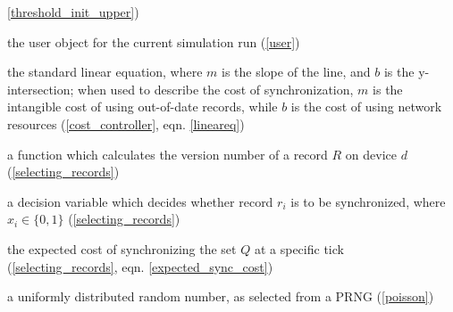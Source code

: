 \begin{description}
\ref{threshold_init_upper})
\item[$U$] the user object for the current simulation run (\ref{user})
\item[$y=mx+b$] the standard linear equation, where $m$ is the slope of the line, and $b$ is the y-intersection; when used to describe the cost of synchronization, $m$ is the intangible cost of using out-of-date records, while $b$ is the cost of using network resources (\ref{cost_controller}, eqn. \ref{lineareq})
\item[$V(R, d)$] a function which calculates the version number of a record $R$ on device $d$ (\ref{selecting_records})
\item[$x_i$] a decision variable which decides whether record $r_i$ is to be synchronized, where $x_i \in \{0, 1\}$ (\ref{selecting_records})
\item[$XC = \sum_{i=1}^n C(r_i)x_i+P_{access}(r_i)\overline{x_i}\cdot(V(r_{i}, s)-V(r_{i}, h))\cdot k$] the expected cost of synchronizing the set $Q$ at a specific tick (\ref{selecting_records}, eqn. \ref{expected_sync_cost})
\item[$Z$] a uniformly distributed random number, as selected from a PRNG (\ref{poisson})
\end{description}